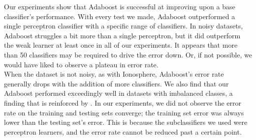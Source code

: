 \documentclass{article}
\begin{document}
Our experiments show that Adaboost is successful at improving upon a base classifier's performance. With every test we made, Adaboost outperformed a single perceptron classifier with a specific range of classifiers. In noisy datasets, Adaboost struggles a bit more than a single perceptron, but it did outperform the weak learner at least once in all of our experiments. It appears that more than 50 classifiers may be required to drive the error down. Or, if not possible, we would have liked to observe a plateau in error rate. \\ 

When the dataset is not noisy, as with Ionosphere, Adaboost's error rate generally drops with the addition of more classifiers. We also find that our Adaboost performed exceedingly well in datasets with imbalanced classes, a finding that is reinforced by \cite{sun-kamel-wang}. In our experiments, we did not observe the error rate on the training and testing sets converge; the training set error was always lower than the testing set's error. This is because the subclassifiers we used were perceptron learners, and the error rate cannot be reduced past a certain point. \\


 
\end{document}
